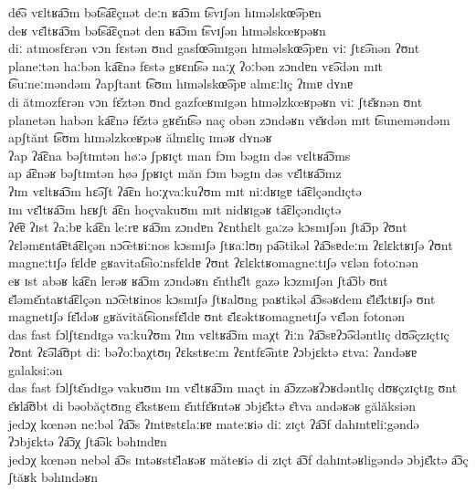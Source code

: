 \begin{exe}
  \ex \gll de͡ə vɛltʁa͡ɔm bət͡sa͡ɛçnət deːn ʁa͡ɔm t͡svɪʃən hɪməlskœ͡əpɐn\\
  deʁ vɛ̆ltʁa͡ɔm bət͡sa͡ɛçnət den ʁa͡ɔm t͡svɪʃən hɪməlskœʁpəʁn\\
  \ex \gll diː atmosfɛrən vɔn fɛstən ʊnd gasfœ͡əmɪgən hɪməlskœ͡əpɐn viː ʃtɛ͡ənən ʔʊnt planeːtən haːbən ka͡ɛnə fɛstə gʁɛnt͡sə naːχ ʔoːbən zɔndɐn vɛ͡ədən mɪt t͡suːneːməndəm ʔapʃtant t͡sʊm hɪməlskœ͡əpɐ almɛːlɪç ʔɪmɐ dʏnɐ\\
  di ătmozfɛrən vɔn fɛ̆ztən ʊnd gazfœʁmɪgən hɪməlzkœʁpəʁn viː ʃtɛ̆ʁnən ʊnt planetən habən ka͡ɛnə fɛ̆ztə gʁɛ̆nt͡sə naç obən zɔndəʁn vɛ̆ʁdən mɪt t͡suneməndəm apʃtănt t͡sʊm hɪməlzkœʁpəʁ ălmɛlɪç ɪməʁ dʏnəʁ\\
  \ex \gll ʔap ʔa͡ɛna bəʃtɪmtən høːə ʃpʁɪçt man fɔm bəgɪn dəs vɛltʁa͡ɔms\\
  ap a͡ɛnəʁ bəʃtɪmtən høə ʃpʁɪçt măn fɔm bəgɪn dəs vɛ̆ltʁa͡ɔmz\\
  \ex \gll ʔɪm vɛltʁa͡ɔm hɛ͡əʃt ʔa͡ɛn hoːχvaːkuʔʊm mɪt niːdʁɪgɐ ta͡ɛlçəndɪçtə\\
  ɪm vɛ̆ltʁa͡ɔm hɛʁʃt a͡ɛn hoçvakuʊm mɪt nidʁɪgəʁ ta͡ɛlçəndɪçtə\\
  \ex \gll ʔe͡ɐ ʔɪst ʔaːbɐ ka͡ɛn leːrɐ ʁa͡ɔm zɔndɐn ʔɛnthɛlt gaːzə kɔsmɪʃən ʃta͡ɔp ʔʊnt ʔɛləmɛnta͡ɐta͡ɛlçən nɔ͡œtʁiːnos kɔsmɪʃə ʃtʁaːlʊŋ pa͡ətikəl ʔa͡ɔsɐdeːm ʔɛlɛktʁɪʃə ʔʊnt magneːtɪʃə fɛldɐ gʁavitat͡sioːnsfɛldɐ ʔʊnt ʔɛlɛktʁomagneːtɪʃə vɛlən fotoːnən\\
  eʁ ɪst abəʁ ka͡ɛn lerəʁ ʁa͡ɔm zɔndəʁn ɛ̆nthɛ̆lt gazə kɔzmɪʃən ʃta͡ɔb ʊnt ɛ̆ləmɛ̆ntaʁta͡ɛlçən nɔ͡œtʁinos kɔsmɪʃə ʃtʁalʊng paʁtikəl a͡ɔsəʁdem ɛ̆lɛ̆ktʁɪʃə ʊnt magnetɪʃə fɛ̆ldəʁ gʁăvităt͡sionsfɛ̆ldɐ ʊnt ɛ̆lɛəktʁomagnetɪʃə vɛ̆lən fotonən\\
  \ex \gll das fast fɔlʃtɛndɪgə vaːkuʔʊm ʔɪm vɛltʁa͡ɔm maχt ʔiːn ʔa͡ɔsɐʔɔ͡ədəntlɪç dʊ͡əçzɪçtɪç ʔʊnt ʔɛ͡əla͡ʊpt diː bəʔoːbaχtʊŋ ʔɛkstʁeːm ʔɛntfɛ͡əntɐ ʔɔbjɛktə ɛtvaː ʔandəʁɐ galaksiːən\\
  das fast fɔlʃtɛ̆ndɪgə vakuʊm ɪm vɛ̆ltʁa͡ɔm maçt in a͡ɔzzəʁʔɔʁdəntlɪç dʊʁçzɪçtɪg ʊnt ɛ̆ʁla͡ʊbt di bəobăçtʊng ɛ̆kstʁem ɛ̆ntfɛ̆ʁntəʁ ɔbjɛ̆ktə ɛ̆tva andəʁəʁ gălăksiən\\
  \ex \gll jedɔχ kœnən neːbəl ʔa͡ɔs ʔɪntɐstɛlaːʁɐ mateːʁiə diː zɪçt ʔa͡ɔf dahɪntɐliːgəndə ʔɔbjɛktə ʔa͡ɔχ ʃta͡ək bəhɪndɐn\\
  jedɔχ kœnən nebəl a͡ɔs ɪntəʁstɛ̆laʁəʁ măteʁiə di zɪçt a͡ɔf dahɪntəʁligəndə ɔbjɛ̆ktə a͡ɔç ʃtăʁk bəhɪndəʁn\\
\end{exe}

